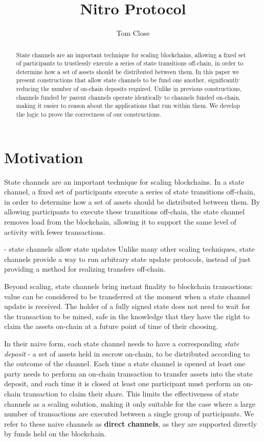 \documentclass{article}
\title{Nitro Protocol}
\author{Tom Close}
\begin{document}
\maketitle
\begin{abstract}
  State channels are an important technique for scaling blockchains, allowing a fixed set of participants to trustlessly execute a series of state transitions off-chain, in order to determine how a set of assets should be distributed between them.
  In this paper we present constructions that allow state channels to be fund one another, significantly reducing the number of on-chain deposits required.
  Unlike in previous constructions, channels funded by parent channels operate identically to channels funded on-chain, making it easier to reason about the applications that run within them.
  We develop the logic to prove the correctness of our constructions.
\end{abstract}

\section{Motivation}

State channels are an important technique for scaling blockchains.
In a state channel, a fixed set of participants execute a series of state transitions off-chain, in order to determine how a set of assets should be distributed between them.
By allowing participants to execute these transitions off-chain, the state channel removes load from the blockchain, allowing it to support the same level of activity with fewer transactions.


- state channels allow state updates 
Unlike many other scaling techniques, state channels provide a way to run arbitrary state update protocols, instead of just providing a method for realizing transfers off-chain.

Beyond scaling, state channels bring instant finality to blockchain transactions:
value can be considered to be transferred at the moment when a state channel update is received.
The holder of a fully signed state does not need to wait for the transaction to be mined, safe in the knowledge
that they have the right to claim the assets on-chain at a future point of time of their choosing.

In their naive form, each state channel needs to have a corresponding \textit{state deposit} - a set of assets held in escrow on-chain, to be distributed according to the outcome of the channel.
Each time a state channel is opened at least one party needs to perform an on-chain transaction to transfer assets into the state deposit, and each time it is closed at least one participant must perform an on-chain transaction to claim their share.
This limits the effectiveness of state channels as a scaling solution, making it only suitable for the case where a large number of transactions are executed between a single group of participants.
We refer to these naive channels as \textbf{direct channels}, as they are supported directly by funds held on the blockchain.
\end{document}
